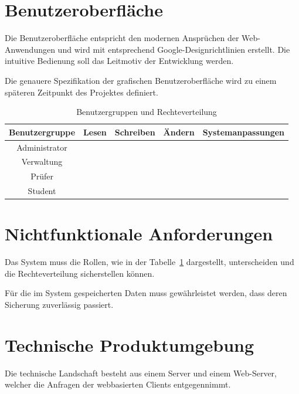 	
	\section{Benutzeroberfläche}
	
	Die Benutzeroberfläche entspricht den modernen Ansprüchen der Web-Anwendungen und wird mit entsprechend Google-Designrichtlinien erstellt. Die intuitive Bedienung soll das Leitmotiv der Entwicklung werden.
	
	Die genauere Spezifikation der grafischen Benutzeroberfläche wird zu einem späteren Zeitpunkt des Projektes definiert. 
	
	\begin{table}[ht]
	\caption{Benutzergruppen und Rechteverteilung}
	\begin{tabular}{|c|c|c|c|c|}
	\hline Benutzergruppe & Lesen & Schreiben & Ändern & Systemanpassungen \\ 
	\hline Administrator & \checkmark & \checkmark & \checkmark & \checkmark \\ 
	\hline Verwaltung & \checkmark & \checkmark & \checkmark &  \\ 
	\hline Prüfer & \checkmark & \checkmark &  &  \\ 
	\hline Student & \checkmark &  &  &  \\ 
	\hline 
	\end{tabular} 
	\label{tab:usergroup}
	\end{table}
	
	
	\section{Nichtfunktionale Anforderungen}
	
	\begin{description}
	\item[/Q10/] Das System muss die Rollen, wie in der Tabelle~\ref{tab:usergroup} dargestellt, unterscheiden und die Rechteverteilung sicherstellen können.
	\item[/Q20/] Für die im System gespeicherten Daten muss gewährleistet werden, dass deren Sicherung zuverlässig passiert.
	\end{description} 

	
	
	
	\section{Technische Produktumgebung}
	Die technische Landschaft besteht aus einem Server und einem Web-Server, welcher die Anfragen der webbasierten Clients entgegennimmt. 
